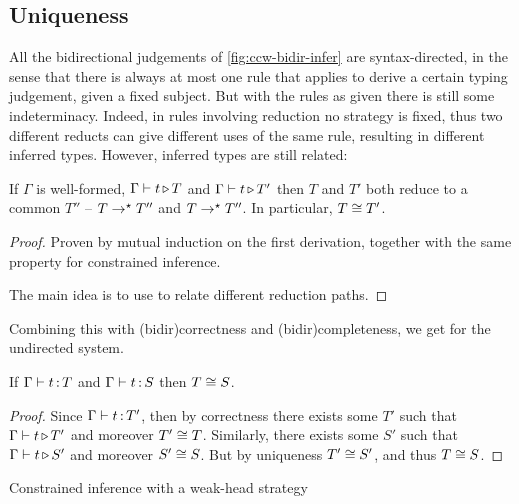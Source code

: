 \subsection{Uniqueness}

All the bidirectional judgements of \cref{fig:ccw-bidir-infer} are syntax-directed,
in the sense that there is always at most one rule that applies to derive a certain typing judgement, given a fixed subject.
But with the rules as given there is still some indeterminacy.
Indeed, in rules involving reduction no strategy is fixed, thus two different reducts can give different uses of the same rule, resulting in different inferred types.
However, inferred types are still related:

\begin{theorem}
  \label{thm:unique-inf}
  If $\Gamma$ is well-formed,
  $\Gamma \vdash t \operatorname{\triangleright} T$ and $\Gamma \vdash t \operatorname{\triangleright} T'$ then $T$ and $T'$ both reduce to a
  common $T''$ – \eg $T \rightarrow^{\star} T''$ and $T \rightarrow^{\star} T''$. In particular, $T \cong T'$.
\end{theorem}

\begin{proof}
  Proven by mutual induction on the first derivation, together with the same property for
  constrained inference.

  The main idea is to use  to relate different reduction paths.
\end{proof}

Combining this with \kl(bidir){correctness} and \kl(bidir){completeness},
we get  for the undirected system.

\begin{theorem}
  \label{thm:unique-undir}
  If $\Gamma \vdash t \operatorname{:} T$ and $\Gamma \vdash t \operatorname{:} S$ then $T \cong S$.
\end{theorem}

\begin{proof}
  Since $\Gamma \vdash t \operatorname{:} T'$, then by correctness
  there exists some $T'$ such that $\Gamma \vdash t \operatorname{\triangleright} T'$ and moreover $T' \cong T$.
  Similarly, there exists some $S'$ such that $\Gamma \vdash t \operatorname{\triangleright} S'$
  and moreover $S' \cong S$.
  But by uniqueness $T' \cong S'$, and thus $T \cong S$.
\end{proof}

\begin{marginfigure}
\caption{Constrained inference with a weak-head strategy}
\label{fig:wh-pinf}
\end{marginfigure}

